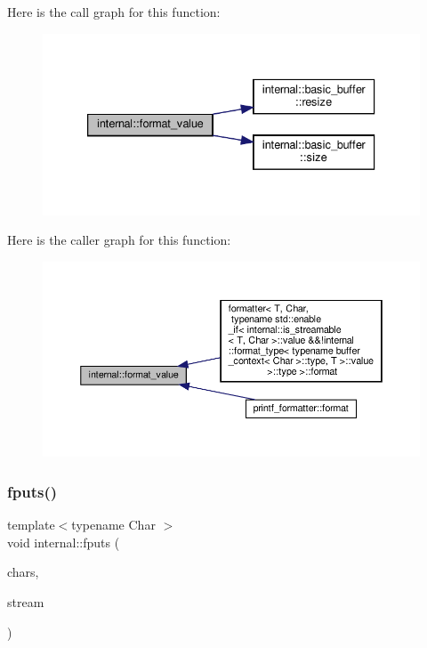 Here is the call graph for this function\+:
\nopagebreak
\begin{figure}[H]
\begin{center}
\leavevmode
\includegraphics[width=333pt]{namespaceinternal_a1be3f9974ada7afa2fc121fd6cf13521_cgraph}
\end{center}
\end{figure}
Here is the caller graph for this function\+:
\nopagebreak
\begin{figure}[H]
\begin{center}
\leavevmode
\includegraphics[width=350pt]{namespaceinternal_a1be3f9974ada7afa2fc121fd6cf13521_icgraph}
\end{center}
\end{figure}
\mbox{\label{namespaceinternal_a5fd63d7d21f506c8c738e5dcecccd35f}} 
\subsubsection{\texorpdfstring{fputs()}{fputs()}}
{\footnotesize\ttfamily template$<$typename Char $>$ \\
void internal\+::fputs (\begin{DoxyParamCaption}\item[{const Char $\ast$}]{chars,  }\item[{F\+I\+LE $\ast$}]{stream }\end{DoxyParamCaption})\hspace{0.3cm}{\ttfamily [inline]}}



